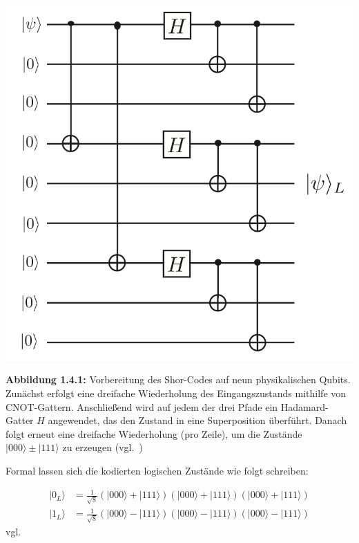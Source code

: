 \begin{center}
    \includegraphics[width=0.75\linewidth]{images/error-correction/Abb3_ShorCode_1.png}

    \vspace{0.5em}

    \par\noindent\textbf{Abbildung 1.4.1:} Vorbereitung des Shor-Codes auf neun physikalischen Qubits. Zunächst erfolgt eine dreifache Wiederholung des Eingangszustands mithilfe von CNOT-Gattern. Anschließend wird auf jedem der drei Pfade ein Hadamard-Gatter \(H\) angewendet, das den Zustand in eine Superposition überführt. Danach folgt erneut eine dreifache Wiederholung (pro Zeile), um die Zustände \(|000\rangle \pm |111\rangle\) zu erzeugen (vgl.~\cite[10]{devitt_quantum_2013})
\end{center}

\medskip

Formal lassen sich die kodierten logischen Zustände wie folgt schreiben:

\[
\begin{aligned}
|0_L\rangle &= \frac{1}{\sqrt{8}} (|000\rangle + |111\rangle)(|000\rangle + |111\rangle)(|000\rangle + |111\rangle) \\
|1_L\rangle &= \frac{1}{\sqrt{8}} (|000\rangle - |111\rangle)(|000\rangle - |111\rangle)(|000\rangle - |111\rangle)
\end{aligned}
\]
vgl.~\cite[10]{devitt_quantum_2013}

